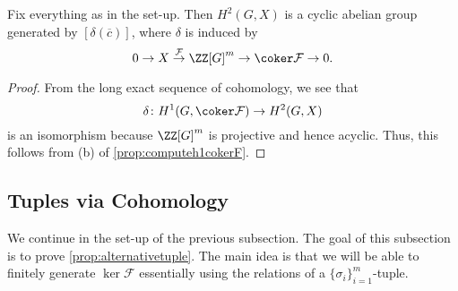 \documentclass{article}
\numberwithin{equation}{section}
\begin{document}
\begin{cor} \label{cor:computeh2x}
	Fix everything as in the set-up. Then $H^2(G,X)$ is a cyclic abelian group generated by $[\delta(\overline c)]$, where $\delta$ is induced by
	\[0\to X\stackrel{\mathcal F}\to\ZZ[G]^m\to\coker\mathcal F\to0.\]
\end{cor}
\begin{proof}
	From the long exact sequence of cohomology, we see that
	\[\delta\colon H^1(G,\coker\mathcal F)\to H^2(G,X)\]
	is an isomorphism because $\ZZ[G]^m$ is projective and hence acyclic. Thus, this follows from (b) of \autoref{prop:computeh1cokerF}.
\end{proof}

\subsection{Tuples via Cohomology}
We continue in the set-up of the previous subsection. The goal of this subsection is to prove \autoref{prop:alternativetuple}. The main idea is that we will be able to finitely generate $\ker\mathcal F$ essentially using the relations of a $\{\sigma_i\}_{i=1}^m$-tuple.
\end{document}
